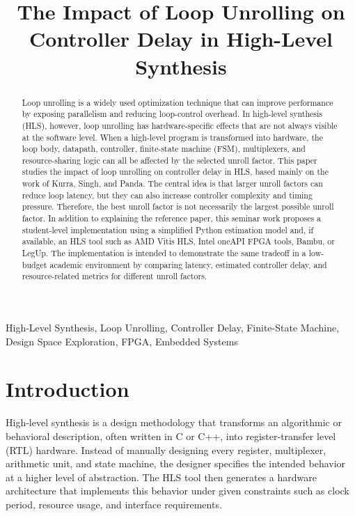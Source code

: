 \documentclass[conference]{IEEEtran}
\begin{document}
\title{The Impact of Loop Unrolling on Controller Delay in High-Level Synthesis}

\author{
}

\maketitle

\begin{abstract}
Loop unrolling is a widely used optimization technique that can improve performance by exposing parallelism and reducing loop-control overhead. In high-level synthesis (HLS), however, loop unrolling has hardware-specific effects that are not always visible at the software level. When a high-level program is transformed into hardware, the loop body, datapath, controller, finite-state machine (FSM), multiplexers, and resource-sharing logic can all be affected by the selected unroll factor. This paper studies the impact of loop unrolling on controller delay in HLS, based mainly on the work of Kurra, Singh, and Panda. The central idea is that larger unroll factors can reduce loop latency, but they can also increase controller complexity and timing pressure. Therefore, the best unroll factor is not necessarily the largest possible unroll factor. In addition to explaining the reference paper, this seminar work proposes a student-level implementation using a simplified Python estimation model and, if available, an HLS tool such as AMD Vitis HLS, Intel oneAPI FPGA tools, Bambu, or LegUp. The implementation is intended to demonstrate the same tradeoff in a low-budget academic environment by comparing latency, estimated controller delay, and resource-related metrics for different unroll factors.
\end{abstract}

\begin{IEEEkeywords}
High-Level Synthesis, Loop Unrolling, Controller Delay, Finite-State Machine, Design Space Exploration, FPGA, Embedded Systems
\end{IEEEkeywords}

\section{Introduction}

High-level synthesis is a design methodology that transforms an algorithmic or behavioral description, often written in C or C++, into register-transfer level (RTL) hardware. Instead of manually designing every register, multiplexer, arithmetic unit, and state machine, the designer specifies the intended behavior at a higher level of abstraction. The HLS tool then generates a hardware architecture that implements this behavior under given constraints such as clock period, resource usage, and interface requirements.
\end{document}
